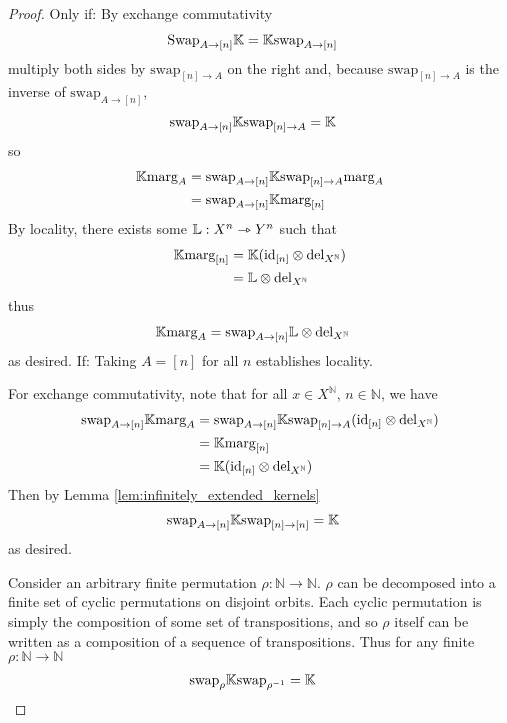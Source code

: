\begin{proof}
Only if:
By exchange commutativity
\begin{align}
    \text{Swap}_{A\rightarrow [n]} \mathbb{K} &= \mathbb{K} \text{swap}_{A\rightarrow [n]}
\end{align}
multiply both sides by $\text{swap}_{[n]\rightarrow A}$ on the right and, because $\text{swap}_{[n]\rightarrow A}$ is the inverse of $\text{swap}_{A\rightarrow [n]}$,
\begin{align}
        \text{swap}_{A\rightarrow [n]} \mathbb{K}\text{swap}_{[n] \rightarrow A} &= \mathbb{K}
\end{align}
so
\begin{align}
    \mathbb{K}\text{marg}_A &= \text{swap}_{A\rightarrow [n]} \mathbb{K}\text{swap}_{[n]\rightarrow A}\text{marg}_A\\
    &= \text{swap}_{A\rightarrow [n]} \mathbb{K}\text{marg}_{[n]}
\end{align}
By locality, there exists some $\mathbb{L}:X^n\rightarrowtriangle Y^n$ such that
\begin{align}
    \mathbb{K} \text{marg}_{[n]} &= \mathbb{K}(\text{id}_{[n]}\otimes \text{del}_{X^{\mathbb{N}}})\\
     &= \mathbb{L}\otimes \mathrm{del}_{X^{\mathbb{N}}}
\end{align}
thus
\begin{align}
    \mathbb{K} \text{marg}_A &= \text{swap}_{A\rightarrow [n]} \mathbb{L}\otimes \text{del}_{X^{\mathbb{N}}}
\end{align}
as desired.
If:
Taking $A=[n]$ for all $n$ establishes locality.

For exchange commutativity, note that for all $x\in X^{\mathbb{N}}$, $n\in\mathbb{N}$, we have
\begin{align}
    \text{swap}_{A\rightarrow [n]} \mathbb{K} \text{marg}_A &= \text{swap}_{A\rightarrow [n]} \mathbb{K} \text{swap}_{[n]\rightarrow A} (\text{id}_{[n]}\otimes \text{del}_{X^{\mathbb{N}}})\\
     &= \mathbb{K} \text{marg}_{[n]}\\
     &= \mathbb{K}(\text{id}_{[n]}\otimes \text{del}_{X^{\mathbb{N}}})
\end{align}
Then by Lemma \ref{lem:infinitely_extended_kernels}
\begin{align}
    \text{swap}_{A\rightarrow [n]} \mathbb{K} \text{swap}_{[n]\rightarrow [n]} &= \mathbb{K}
\end{align}
as desired.

Consider an arbitrary finite permutation $\rho:\mathbb{N}\to \mathbb{N}$. $\rho$ can be decomposed into a finite set of cyclic permutations on disjoint orbits. Each cyclic permutation is simply the composition of some set of transpositions, and so $\rho$ itself can be written as a composition of a sequence of transpositions. Thus for any finite $\rho:\mathbb{N}\to\mathbb{N}$
\begin{align}
    \text{swap}_{\rho} \mathbb{K} \text{swap}_{\rho^{-1}} &= \mathbb{K}
\end{align}
\end{proof}


